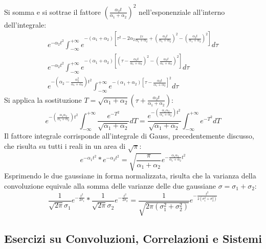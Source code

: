 \documentclass{article}
\numberwithin{equation}{subsection}
\begin{document}
Si somma e si sottrae il fattore $\displaystyle\left(\frac{\alpha_2t}{\alpha_1+\alpha_2}\right)^2$ nell'esponenziale all'interno dell'integrale:
\begin{gather*}
    \displaystyle e^{-\alpha_2 t^2}\int_{-\infty}^{+\infty}e^{-(\alpha_1+\alpha_2)\left[\tau^2-2\alpha_2\frac{t\tau}{\alpha_1+\alpha_2}+\left(\frac{\alpha_2t}{\alpha_1+\alpha_2}\right)^2-\left(\frac{\alpha_2t}{\alpha_1+\alpha_2}\right)^2\right]}d\tau\\
    \displaystyle e^{-\alpha_2 t^2}\int_{-\infty}^{+\infty}e^{-(\alpha_1+\alpha_2)\left[\left(\tau-\frac{\alpha_2t}{\alpha_1+\alpha_2}\right)^2-\left(\frac{\alpha_2t}{\alpha_1+\alpha_2}\right)^2\right]}d\tau\\
    \displaystyle e^{-\left(\alpha_2-\frac{\alpha_2^2}{\alpha_1+\alpha_2}\right)t^2}\int_{-\infty}^{+\infty}e^{-(\alpha_1+\alpha_2)\left[\tau-\frac{\alpha_2t}{\alpha_1+\alpha_2}\right]^2}d\tau
\end{gather*}
Si applica la sostituzione $T=\displaystyle\sqrt{\alpha_1+\alpha_2}\left(\tau+\frac{\alpha_2t}{\alpha_1+\alpha_2}\right)$:
\begin{equation*}
    \displaystyle e^{-\left(\frac{\alpha_1\alpha_2}{\alpha_1+\alpha_2}\right)t^2}\int_{-\infty}^{+\infty}\frac{e^{-T^2}}{\sqrt{\alpha_1+\alpha_2}}dT=\frac{e^{-\left(\frac{\alpha_1\alpha_2}{\alpha_1+\alpha_2}\right)t^2}}{\sqrt{\alpha_1+\alpha_2}}\int_{-\infty}^{+\infty}{e^{-T^2}}dT
\end{equation*}
Il fattore integrale corrisponde all'integrale di Gauss, precedentemente discusso, che risulta su tutti i reali in un area di $\sqrt\pi$:
\begin{equation*}
    e^{-\alpha_1t^2}*e^{-\alpha_2t^2}=\displaystyle\sqrt{\frac{\pi}{\alpha_1+\alpha_2}}e^{-\frac{\alpha_1\alpha_2}{\alpha_1+\alpha_2}t^2}
\end{equation*}
Esprimendo le due gaussiane in forma normalizzata, risulta che la varianza della convoluzione equivale alla somma delle varianze delle due gaussiane $\sigma=\sigma_1+\sigma_2$:
\begin{equation}
    \displaystyle\frac{1}{\sqrt{2\pi}\sigma_1}e^{-\frac{t^2}{2\sigma_1}}*\frac{1}{\sqrt{2\pi}\sigma_2}e^{-\frac{t^2}{2\sigma_2}}=\frac{1}{\sqrt{2\pi(\sigma_1^2+\sigma_2^2)}}e^{-\frac{t^2}{2(\sigma_1^2+\sigma_2^2)}}
\end{equation}

\subsection{Esercizi su Convoluzioni, Correlazioni e Sistemi}
\end{document}
